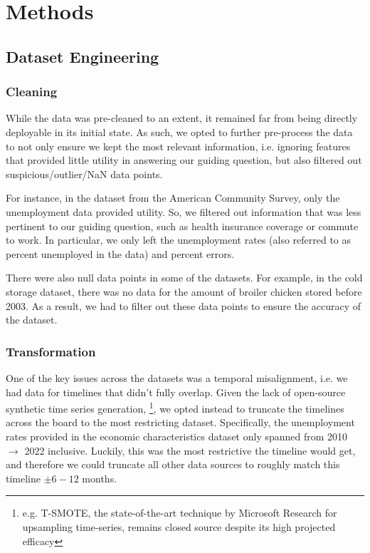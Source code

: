 \documentclass[12pt]{article}
\begin{document}
\section{Methods}
    \subsection{Dataset Engineering}
        \subsubsection{Cleaning}
        While the data was pre-cleaned to an extent, it remained far from being directly deployable in its initial state. As such, we opted to further pre-process the data to not only ensure we kept the most relevant information, i.e. ignoring features that provided little utility in answering our guiding question, but also filtered out suspicious/outlier/NaN data points.
        
        For instance, in the dataset from the American Community Survey, only the unemployment data provided utility. So, we filtered out information that was less pertinent to our guiding question, such as health insurance coverage or commute to work. In particular, we only left the unemployment rates (also referred to as percent unemployed in the data) and percent errors.

        There were also null data points in some of the datasets. For example, in the cold storage dataset, there was no data for the amount of broiler chicken stored before 2003. As a result, we had to filter out these data points to ensure the accuracy of the dataset.

        \subsubsection{Transformation}
        One of the key issues across the datasets was a temporal misalignment, i.e. we had data for timelines that didn't fully overlap. Given the lack of open-source synthetic time series generation, \footnote{e.g. T-SMOTE, the state-of-the-art technique by Microsoft Research for upsampling time-series, remains closed source despite its high projected efficacy}\cite{T_SMOTE}, we opted instead to truncate the timelines across the board to the most restricting dataset. Specifically, the unemployment rates provided in the economic characteristics dataset only spanned from 2010 $\to$ 2022 inclusive. Luckily, this was the most restrictive the timeline would get, and therefore we could truncate all other data sources to roughly match this timeline $\pm6 - 12$ months.
\end{document}
